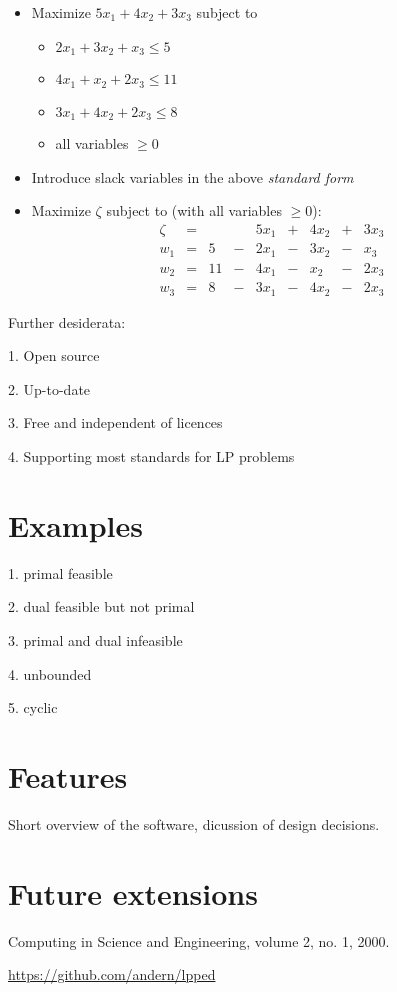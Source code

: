 \documentclass[ukenglish]{nik}
\begin{document}
 \begin{itemize}
    \item Maximize $5 x_1 + 4 x_2 + 3 x_3$ subject to
    \begin{itemize}
      \item $2 x_1 + 3 x_2 + x_3 \leq 5$
      \item $4 x_1 + x_2 + 2 x_3 \leq 11$
      \item $3 x_1 + 4 x_2 + 2 x_3 \leq 8$
      \item all variables $\geq 0$
    \end{itemize}
    \item Introduce slack variables in the above \emph{standard form}
    \item Maximize $\zeta$ subject to (with all variables $\geq 0$):
\[    
    \begin{array}{lcrcrcrcr}
      \zeta&=&   & & 5 x_1 &+& 4 x_2 &+& 3 x_3 \\\hline
      w_1  &=& 5 &-& 2 x_1 &-& 3 x_2 &-&   x_3 \\
      w_2  &=& 11&-& 4 x_1 &-&   x_2 &-& 2 x_3 \\
      w_3  &=& 8 &-& 3 x_1 &-& 4 x_2 &-& 2 x_3 
    \end{array}
\]
  \end{itemize}

Further desiderata:

1. Open source

2. Up-to-date

3. Free and independent of licences

4. Supporting most standards for LP problems

\section{Examples}
1. primal feasible

2. dual feasible but not primal

3. primal and dual infeasible

4. unbounded

5. cyclic

\section{Features}
Short overview of the software, dicussion of design decisions.

\section{Future extensions}





\begin{thebibliography}{99}
 Computing in Science and Engineering, volume 2, no. 1, 2000.

\url{https://github.com/andern/lpped}
\end{thebibliography}
\end{document}
